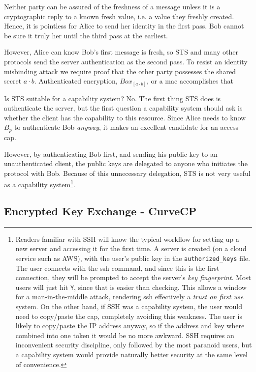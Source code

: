 \documentclass[12pt]{article}
\begin{document}
Neither party can be assured of the freshness of a message
unless it is a cryptographic reply to a known fresh value,
i.e. a value they freshly created. Hence, it is pointless for Alice
to send her identity in the first pass. Bob cannot be sure it truly her
until the third pass at the earliest.

However, Alice can know Bob's first message is fresh, so STS and many
other protocols send the server authentication as the second pass.
To resist an identity misbinding attack we require proof that the
other party possesses the shared secret $a\cdot b$. Authenticated encryption,
$Box_{[a\cdot b]}$, or a mac accomplishes that \cite[section 3.1]{sigma}


Is STS suitable for a capability system? No. The first thing STS
does is authenticate the server, but the first question a capability
system should ask is whether the client has the capability to
this resource. Since Alice needs to know $B_p$ to authenticate
Bob \emph{anyway}, it makes an excellent candidate for an access cap.

However, by authenticating Bob first, and sending his public key to
an unauthenticated client, the public keys are delegated to anyone
who initiates the protocol with Bob. Because of this unnecessary
delegation, STS is not very useful as a capability system\footnote{
  Readers familiar with SSH will know the typical workflow for setting
  up a new server and accessing it for the first time. A server is
  created (on a cloud service such as AWS), with the user's public
  key in the \texttt{authorized\_keys} file. The user connects with the
  ssh command, and since this is the first connection, they will be
  prompted to accept the server's \emph{key fingerprint}.
  Most users will just hit \texttt{Y}, since that is easier than
  checking. This allows a window for a man-in-the-middle attack,
  rendering ssh effectively a \emph{trust on first use} system.
  On the other hand, if SSH was a capability system, the user would
  need to copy/paste the cap, completely avoiding this weakness.
  The user is likely to copy/paste the IP address anyway, so if the
  address and key where combined into one token it would be no more
  awkward.
  SSH requires an inconvenient security discipline, only
  followed by the most paranoid users, but a capability system
  would provide naturally better security at the same level of
  convenience.
}.

\subsection{Encrypted Key Exchange - CurveCP}
\end{document}
